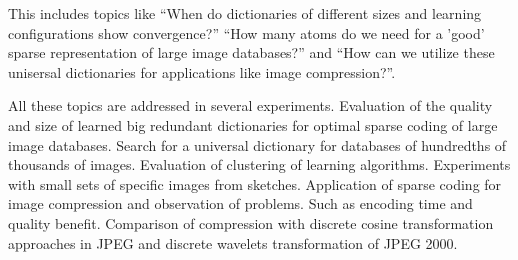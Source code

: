 This includes topics like 
``When do dictionaries of different sizes and learning configurations show
convergence?'' 
``How many atoms do we need for a 'good' sparse representation of large image
databases?''  and 
``How can we utilize these unisersal dictionaries for applications like
image compression?''. 

All these topics are addressed in several experiments.
Evaluation of the quality and size of learned big redundant dictionaries
for optimal sparse coding of large image databases. Search for a universal
dictionary for databases of hundredths of thousands of images. Evaluation of
clustering of learning algorithms. Experiments with small sets of specific
images from sketches. 
Application of sparse coding for image compression and observation of problems.
Such as encoding time and quality benefit. Comparison of compression with
discrete cosine transformation approaches in JPEG and discrete wavelets
transformation of JPEG 2000.




